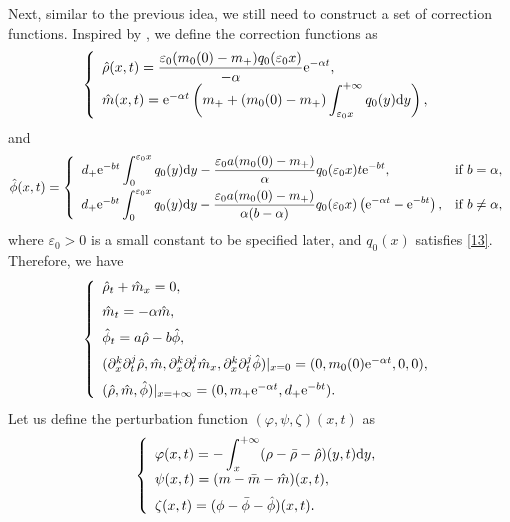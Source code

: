 \documentclass[11pt]{article}
\theoremstyle{plain}
\numberwithin{equation}{section}
\begin{document}
Next, similar to the previous idea, we still need to construct a set of correction functions. Inspired by \cite{Nishihara-Yang1999}, we define the correction functions as
\begin{equation}\label{3.8}
 \left\{ \begin{array}{l}
 \hat{\rho}(x,t)=\displaystyle\frac{\varepsilon_{0}(m_{0}(0)-m_{+})q_0(\varepsilon_{0}x)}{-\alpha}{\rm e}^{-\alpha t},\\[3pt]
\hat{m}(x,t) = {\rm e}^{-\alpha t} \left(m_+ + (m_{0}(0)-m_{+}) \displaystyle\int^{+\infty}_{\varepsilon_0 x} q_0(y){\rm d}y\right),
\end{array} \right.
\end{equation}
and 
\begin{equation}\label{3.8a}
		\hat\phi(x,t)=\left\{\begin{array}{cl}
			d_+{\rm e}^{-bt}\displaystyle\int_{0}^{\varepsilon_0 x} q_0(y){\rm d}y-\displaystyle\frac{\varepsilon_{0}a(m_{0}(0)-m_{+})}{\alpha}q_0(\varepsilon_{0}x)t{\rm e}^{-bt},~~~~~~~~~~~~ & \textrm{if}\ b=\alpha,\\[3mm]
			d_+{\rm e}^{-bt}\displaystyle\int_{0}^{\varepsilon_0 x} q_0(y){\rm d}y-\displaystyle\frac{\varepsilon_{0}a(m_{0}(0)-m_{+})}{\alpha(b-\alpha)}q_0(\varepsilon_{0}x)\left({\rm e}^{-\alpha t}-{\rm e}^{-bt}\right), & \textrm{if}\ b\neq\alpha,
		\end{array}\right.
	\end{equation}
where $\varepsilon_{0}>0$ is a small constant to be specified later, and $q_{0}(x)$ satisfies \eqref{13}.
 Therefore, we have
\begin{equation}\label{3.9}
 \left\{ \begin{array}{l}
  \hat\rho_t+\hat m_x=0,     \\[2mm]
			\hat m_t=-\alpha\hat m, \\[2mm]
			\hat\phi_t=a\hat\rho-b\hat\phi, \\[2mm]
  (\partial^{k}_{x}\partial^{j}_{t}\hat{\rho},\hat{m}, \partial^{k}_{x}\partial^{j}_{t}\hat{m}_x, \partial^{k}_{x}\partial^{j}_{t}\hat\phi)|_{x=0}=(0, m_{0}(0){\rm e}^{-\alpha t} ,0,0), \\[2mm]
   (\hat{\rho},\hat{m},\hat\phi)|_{x=+\infty}=(0, m_{+}{\rm e}^{-\alpha t} ,d_+{\rm e}^{-bt}).
  \end{array} \right.
\end{equation}
Let us define the
	perturbation function $(\varphi,\psi,\zeta)(x,t)$ as
	\begin{equation}\notag
		\left\{
		\begin{array}{lr}
			\varphi(x,t)=-\displaystyle\int^{+\infty}_{x}(\rho-\bar\rho-\hat\rho)(y,t){\rm d}y,\\[2mm]
			\psi(x,t)=(m-\bar m-\hat m)(x,t),\\[2mm]
			\zeta(x,t)=(\phi-\bar\phi-\hat\phi)(x,t).
		\end{array}
		\right.
	\end{equation}
\end{document}
